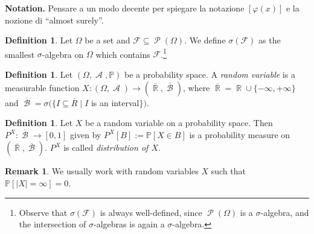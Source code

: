 \documentclass[12pt,a4paper]{report}
\theoremstyle{definition}
\newtheorem{definition}[theorem]{Definition}
\newtheorem*{remark}{Remark}
\theoremstyle{num.custom-title}
\DeclareMathOperator{\A}{\mathcal{A}}
\DeclareMathOperator{\B}{\mathcal{B}}
\DeclareMathOperator{\PP}{\mathcal{P}}
\DeclareMathOperator{\R}{\mathbb{R}}
\DeclareMathOperator{\sse}{\subseteq}
\newcommand{\ol}{\overline}
\newcommand{\F}{\mathcal{F}}
\renewcommand{\phi}{\varphi}
\renewcommand{\1}{\mathbbm{1}}
\renewcommand{\P}{\mathbb{P}}
\begin{document}
\noindent\textbf{Notation.} Pensare a un modo decente per spiegare la notazione $[\phi(x)]$ e la nozione di ``almost surely''.

\begin{definition}
Let $\Omega$ be a set and $\F \sse \PP(\Omega)$. We define $\sigma(\F)$ as the smallest $\sigma$-algebra on $\Omega$ which contains $\F$.\footnote{Observe that $\sigma(\F)$ is always well-defined, since $\PP(\Omega)$ is a $\sigma$-algebra, and the intersection of $\sigma$-algebras is again a $\sigma$-algebra.}
\end{definition}

\begin{definition}
Let $(\Omega, \A, \P)$ be a probability space. A \emph{random variable} is a measurable function $X : (\Omega, \A) \to (\ol{\R}, \ol{\B})$, where $\ol{\R} = \R \cup \{-\infty, +\infty\}$ and $\ol{\B} = \sigma(\{I \sse \ol{R} \mid I $ is an interval$\})$.
\end{definition}

\begin{definition}
Let $X$ be a random variable on a probability space. Then $P^X : \ol{\B} \to [0,1]$ given by $P^X[B] := \P[X \in B]$ is a probability measure on $(\ol{\R},\ol{\B})$. $P^X$ is called \emph{distribution of $X$}.
\end{definition}

\begin{remark}
We usually work with random variables $X$ such that $\P[|X|=\infty]=0$.
\end{remark}
\end{document}
